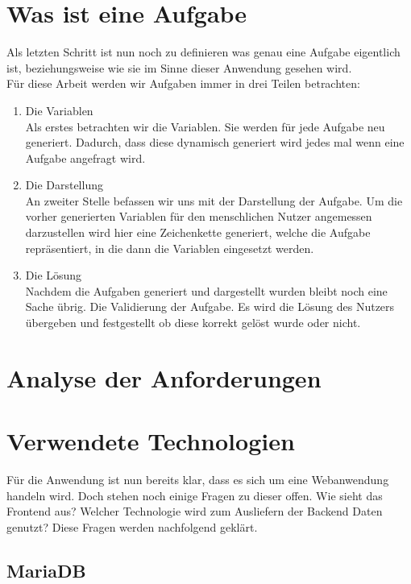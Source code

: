\section{Was ist eine Aufgabe}

Als letzten Schritt ist nun noch zu definieren was genau eine Aufgabe eigentlich ist, beziehungsweise wie sie im Sinne dieser Anwendung gesehen wird. \\
Für diese Arbeit werden wir Aufgaben immer in drei Teilen betrachten:
\begin{enumerate}
\item Die Variablen \\
Als erstes betrachten wir die Variablen. Sie werden für jede Aufgabe neu generiert. Dadurch, dass diese dynamisch generiert wird jedes mal wenn eine Aufgabe angefragt wird.
\item Die Darstellung \\
An zweiter Stelle befassen wir uns mit der Darstellung der Aufgabe. Um die vorher generierten Variablen für den menschlichen Nutzer angemessen darzustellen wird hier eine Zeichenkette generiert, welche die Aufgabe repräsentiert, in die dann die Variablen eingesetzt werden.
\item Die Lösung \\
Nachdem die Aufgaben generiert und dargestellt wurden bleibt noch eine Sache übrig. Die Validierung der Aufgabe. Es wird die Lösung des Nutzers übergeben und festgestellt ob diese korrekt gelöst wurde oder nicht.
\end{enumerate}


\section{Analyse der Anforderungen}

\section{Verwendete Technologien}

Für die Anwendung ist nun bereits klar, dass es sich um eine Webanwendung handeln wird. Doch stehen noch einige Fragen zu dieser offen. Wie sieht das Frontend aus? Welcher Technologie wird zum Ausliefern der Backend Daten genutzt? Diese Fragen werden nachfolgend geklärt.


\subsection{MariaDB}

